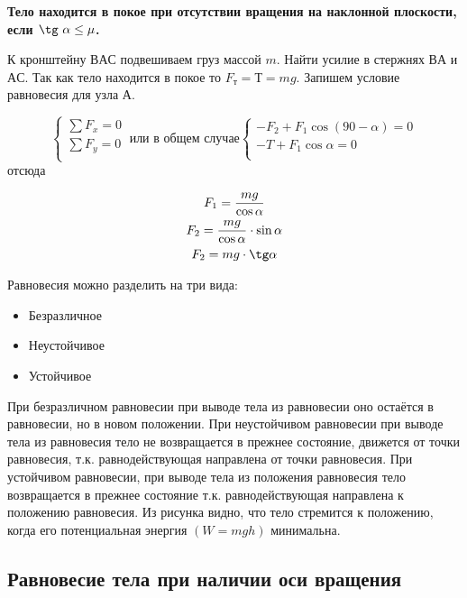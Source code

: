 \documentclass[a5paper, 10pt]{diss_4}
\renewcommand{\'}{\,'}
\begin{document}
\textbf{Тело находится в покое при отсутствии вращения на наклонной плоскости, если $\tg\ \alpha\leq\mu$.}

К кронштейну $ВАС$ подвешиваем груз массой $m$. Найти усилие в стержнях $ВА$ и $АС$.
Так как тело находится в покое то $F_т=Т= mg$. Запишем условие равновесия для узла $А$.

\begin{equation*}
     \left\{
          \begin{array}{lr}
            \sum F_x=0\\
            \sum F_y=0\\
          \end{array}
     \right.\ \text{или в общем случае}
     \left\{
          \begin{array}{lr}
            -F_2+F_1\cos (90-\alpha)=0\\
            -T+F_1\cos\alpha=0\\
          \end{array}
     \right.
\end{equation*}
отсюда

\begin{gather*}
F_1=\frac{mg}{\cos\alpha}\\
F_2=\frac{mg}{\cos\alpha}\cdot\sin\alpha\\
F_2=mg\cdot\tg\alpha
\end{gather*}


Равновесия  можно разделить на три вида:
\begin{itemize}
  \item Безразличное
  \item Неустойчивое
  \item Устойчивое
\end{itemize}

 При безразличном равновесии при выводе тела из равновесии оно остаётся в
равновесии, но в новом положении. При неустойчивом равновесии при выводе тела
из равновесия тело не возвращается в прежнее состояние, движется от точки
равновесия, т.к. равнодействующая направлена от точки равновесия. При
устойчивом равновесии, при выводе тела из положения равновесия тело
возвращается в прежнее состояние т.к. равнодействующая направлена к положению
равновесия. Из рисунка видно, что тело стремится к положению, когда его
потенциальная энергия $(W=mgh)$ минимальна.

\subsection{Равновесие тела при  наличии оси вращения}
\end{document}
